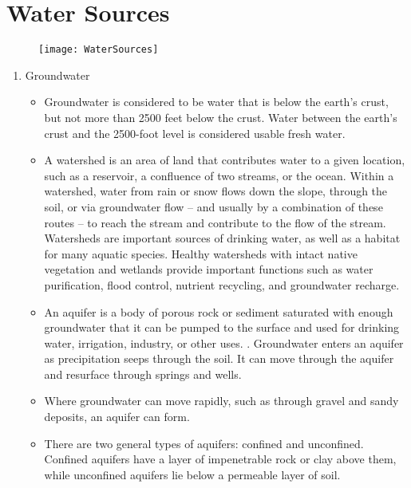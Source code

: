 
\chapter{Water Sources}


\begin{figure}
\begin{center}
\texttt{[image: WaterSources]}\\
\end{center}
\end{figure}
\begin{enumerate}
\item Groundwater
\begin{itemize}
\item Groundwater is considered to be water that is below the earth’s crust, but not more than 2500 feet below the crust. Water between the earth’s crust and the 2500-foot level is considered usable fresh water.\\

\item A watershed is an area of land that contributes water to a given location, such as a reservoir, a confluence of two streams, or the ocean. Within a watershed, water from rain or snow flows down the slope, through the soil, or via groundwater flow – and usually by a combination of these routes – to reach the stream and contribute to the flow of the stream. Watersheds are
important sources of drinking water, as well as a habitat for many aquatic species. Healthy watersheds with intact native vegetation and wetlands provide important functions such as water purification, flood control, nutrient recycling, and groundwater recharge.

\item An aquifer is a body of porous rock or sediment saturated with enough groundwater that it can be pumped to the surface and used for drinking water, irrigation, industry, or other uses. . Groundwater enters an aquifer as precipitation seeps through the soil. It can move through the aquifer and resurface through springs and wells.

\item Where groundwater can move rapidly, such as through gravel and sandy
deposits, an aquifer can form.  

\item There are two general types of aquifers: confined and unconfined. Confined aquifers have a layer of impenetrable rock or clay above them, while unconfined aquifers lie below a permeable layer of soil.


\end{itemize}
\end{enumerate}
